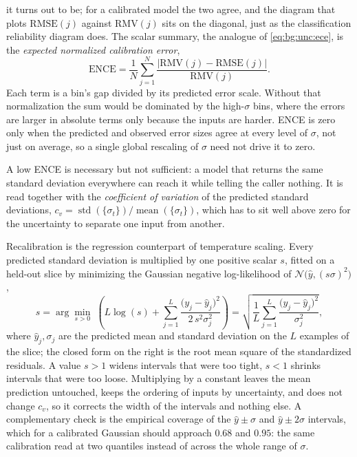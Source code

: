         it turns out to be; for a calibrated model the two agree, and the diagram that
        plots $\mathrm{RMSE}(j)$ against $\mathrm{RMV}(j)$ sits on the diagonal, just as
        the classification reliability diagram does. The scalar summary, the analogue of
        \eqref{eq:bg:unc:ece}, is the \emph{expected normalized calibration error},
        \begin{equation}
            \mathrm{ENCE} = \frac{1}{N} \sum_{j=1}^{N}
            \frac{\bigl\lvert \mathrm{RMV}(j) - \mathrm{RMSE}(j) \bigr\rvert}{\mathrm{RMV}(j)} .
            \label{eq:bg:unc:ence}
        \end{equation}
        Each term is a bin's gap divided by its predicted error scale. Without that
        normalization the sum would be dominated by the high-$\sigma$ bins, where the
        errors are larger in absolute terms only because the inputs are harder. ENCE
        is zero only when the predicted and observed error sizes agree at every level
        of $\sigma$, not just on average, so a single global rescaling of $\sigma$
        need not drive it to zero.

        A low ENCE is necessary but not sufficient: a model that returns the same
        standard deviation everywhere can reach it while telling the caller nothing. It
        is read together with the \emph{coefficient of variation} of the predicted
        standard deviations,
        $c_v = \operatorname{std}(\{\sigma_t\}) / \operatorname{mean}(\{\sigma_t\})$,
        which has to sit well above zero for the uncertainty to separate one input from
        another.
        
        Recalibration is the regression counterpart of temperature scaling. Every
        predicted standard deviation is multiplied by one positive scalar $s$, fitted on
        a held-out slice by minimizing the Gaussian negative log-likelihood of
        $\mathcal{N}\!\bigl( \hat{y}, (s\sigma)^{2} \bigr)$,
        \begin{equation}
            s = \arg\min_{s > 0} \; 
            \left( L\log (s)
            + \sum_{j=1}^{L}\frac{\bigl( y_j - \hat{y}_j \bigr)^{2}}{2\, s^{2} \sigma_j^{2}} \right)
            = \sqrt{ \frac{1}{L} \sum_{j=1}^{L}
            \frac{\bigl( y_j - \hat{y}_j \bigr)^{2}}{\sigma_j^{2}} } ,
            \label{eq:bg:unc:sigmafit}
        \end{equation}
        where $\hat{y}_j, \sigma_j$ are the predicted mean and standard deviation on the
        $L$ examples of the slice; the closed form on the right is the root mean square
        of the standardized residuals. A value $s > 1$ widens intervals that were too
        tight, $s < 1$ shrinks intervals that were too loose. Multiplying by a constant
        leaves the mean prediction untouched, keeps the ordering of inputs by
        uncertainty, and does not change $c_v$, so it corrects the width of the
        intervals and nothing else. A complementary check is the empirical coverage
        of the $\hat{y} \pm \sigma$ and $\hat{y} \pm 2\sigma$ intervals, which for a
        calibrated Gaussian should approach $0.68$ and $0.95$: the same calibration
        read at two quantiles instead of across the whole range of $\sigma$.

